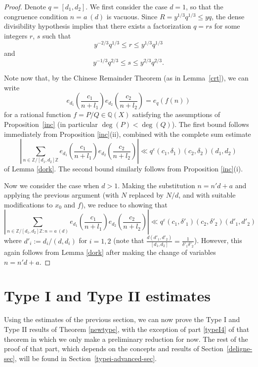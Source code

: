 \documentclass[12pt,a4paper,reqno]{amsart}
\numberwithin{equation}{section}
\theoremstyle{plain}
\theoremstyle{definition}
\newcommand\Z{\mathbb{Z}}
\newcommand\Q{\mathbb{Q}}
\newcommand\eps{\varepsilon}
\begin{document}
\begin{proof} Denote $q=[d_1,d_2]$. We first consider the case $d=1$,
  so that the congruence condition $n = a\ (d)$ is vacuous.  Since
  $R=y^{1/3}q^{1/3}\leq yq$, the dense divisibility hypothesis implies
  that there exists a factorization $q = rs$ for some integers $r$,
  $s$ such that
$$ 
y^{-2/3}q^{1/3} \leq r \leq y^{1/3} q^{1/3}
$$
and
$$ 
y^{-1/3}q^{2/3} \leq s \leq y^{2/3} q^{2/3}.
$$

Note now that, by the Chinese Remainder Theorem (as in
Lemma~\ref{crt}), we can write
$$
e_{d_1}\left( \frac{c_1}{n+l_1} \right) e_{d_2}\left(
  \frac{c_2}{n+l_2} \right)=
e_q(f(n))
$$
for a rational function $f=P/Q\in \Q(X)$ satisfying the assumptions of
Proposition~\ref{inc} (in particular $\deg(P)<\deg(Q)$).  The first bound follows
immediately from Proposition \ref{inc}(ii), combined with the complete
sum estimate
$$ 
\left|\sum_{n \in \Z/[d_1,d_2]\Z} e_{d_1}\left( \frac{c_1}{n+l_1}
  \right) e_{d_2}\left( \frac{c_2}{n+l_2} \right)\right| \ll
q^{\eps}(c_1,\delta_1) (c_2,\delta_2) (d_1,d_2)
$$
of Lemma \ref{dork}.  The second bound similarly follows from
Proposition \ref{inc}(i).

Now we consider the case when $d> 1$.  Making the substitution $n = n' d + a$ and applying the previous argument (with $N$ replaced by $N/d$, and with suitable modifications to $x_0$ and $f$), we reduce to showing that
$$ 
\left|\sum_{n \in \Z/[d_1,d_2]\Z: n = a\ (d)} e_{d_1}\left( \frac{c_1}{n+l_1}
  \right) e_{d_2}\left( \frac{c_2}{n+l_2} \right)\right| \ll
q^{\eps}(c_1,\delta'_1) (c_2,\delta'_2) (d'_1,d'_2)
$$
where $d'_i := d_i / (d,d_i)$ for $i=1,2$ (note that $\frac{d (d'_1,d'_2)}{[d_1,d_2]} = \frac{1}{\delta'_1 \delta'_2}$).  However, this again follows from Lemma \ref{dork} after making the change of variables $n = n'd+a$.
\end{proof}




\section{Type I and Type II estimates}\label{typei-ii-sec}

Using the estimates of the previous section, we can now prove the Type
I and Type II results of Theorem \ref{newtype}, with the exception of
part \eqref{typeI4} of that theorem in which we only make a
preliminary reduction for now. The rest of the proof of that part,
which depends on the concepts and results of
Section~\ref{deligne-sec}, will be found in
Section~\ref{typei-advanced-sec}.
\end{document}
